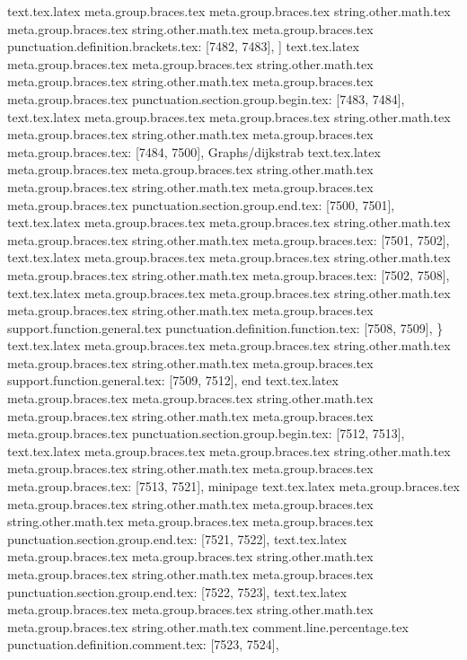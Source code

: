 {{{{{{{{{{{{{{{{{{{{{{{{{{{{{{{{{{{{{{{{{{{{{{{{{{{{{{{{{{{{{{{{{{{{{{{{{{{{{{{{{{{{{{{{{{{{{{{{{{{{{{{{{{{{{{{{{{{{{{{{{{{{{{{{{{{{{{{{{{{{{{{{{{{{{{{{{{{{{{{{{{{{{{{{{{{{{{{{{{{{{{{{{{{{{{{{{{{{{{{{{{{{text.tex.latex meta.group.braces.tex meta.group.braces.tex string.other.math.tex meta.group.braces.tex string.other.math.tex meta.group.braces.tex punctuation.definition.brackets.tex: [7482, 7483], {]}
text.tex.latex meta.group.braces.tex meta.group.braces.tex string.other.math.tex meta.group.braces.tex string.other.math.tex meta.group.braces.tex meta.group.braces.tex punctuation.section.group.begin.tex: [7483, 7484], {{}
text.tex.latex meta.group.braces.tex meta.group.braces.tex string.other.math.tex meta.group.braces.tex string.other.math.tex meta.group.braces.tex meta.group.braces.tex: [7484, 7500], {Graphs/dijkstrab}
text.tex.latex meta.group.braces.tex meta.group.braces.tex string.other.math.tex meta.group.braces.tex string.other.math.tex meta.group.braces.tex meta.group.braces.tex punctuation.section.group.end.tex: [7500, 7501], {}}
text.tex.latex meta.group.braces.tex meta.group.braces.tex string.other.math.tex meta.group.braces.tex string.other.math.tex meta.group.braces.tex: [7501, 7502], {
}
text.tex.latex meta.group.braces.tex meta.group.braces.tex string.other.math.tex meta.group.braces.tex string.other.math.tex meta.group.braces.tex: [7502, 7508], {      }
text.tex.latex meta.group.braces.tex meta.group.braces.tex string.other.math.tex meta.group.braces.tex string.other.math.tex meta.group.braces.tex support.function.general.tex punctuation.definition.function.tex: [7508, 7509], {\}
text.tex.latex meta.group.braces.tex meta.group.braces.tex string.other.math.tex meta.group.braces.tex string.other.math.tex meta.group.braces.tex support.function.general.tex: [7509, 7512], {end}
text.tex.latex meta.group.braces.tex meta.group.braces.tex string.other.math.tex meta.group.braces.tex string.other.math.tex meta.group.braces.tex meta.group.braces.tex punctuation.section.group.begin.tex: [7512, 7513], {{}
text.tex.latex meta.group.braces.tex meta.group.braces.tex string.other.math.tex meta.group.braces.tex string.other.math.tex meta.group.braces.tex meta.group.braces.tex: [7513, 7521], {minipage}
text.tex.latex meta.group.braces.tex meta.group.braces.tex string.other.math.tex meta.group.braces.tex string.other.math.tex meta.group.braces.tex meta.group.braces.tex punctuation.section.group.end.tex: [7521, 7522], {}}
text.tex.latex meta.group.braces.tex meta.group.braces.tex string.other.math.tex meta.group.braces.tex string.other.math.tex meta.group.braces.tex punctuation.section.group.end.tex: [7522, 7523], {}}
text.tex.latex meta.group.braces.tex meta.group.braces.tex string.other.math.tex meta.group.braces.tex string.other.math.tex comment.line.percentage.tex punctuation.definition.comment.tex: [7523, 7524], {%
}}}}}}}}}}}}}}}}}}}}}}}}}}}}}}}}}}}}}}}}}}}}}}}}}}}}}}}}}}}}}}}}}}}}}}}}}}}}}}}}}}}}}}}}}}}}}}}}}}}}}}}}}}}}}}}}}}}}}}}}}}}}}}}}}}}}}}}}}}}}}}}}}}}}}}}}}}}}}}}}}}}}}}}}}}}}}}}}}}}}}}}}}}}}}}}}}}}}}}}}}}}}}
